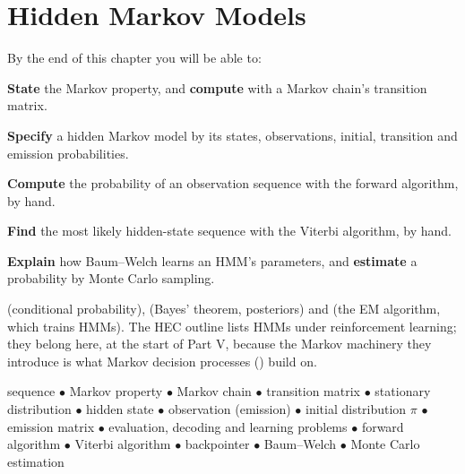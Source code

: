 \chapter{Hidden Markov Models}\label{ch:hmm}

\begin{outcomes}
By the end of this chapter you will be able to:
\begin{tight}
  \item \textbf{State} the Markov property, and \textbf{compute} with a Markov
        chain's transition matrix.
  \item \textbf{Specify} a hidden Markov model by its states, observations, initial,
        transition and emission probabilities.
  \item \textbf{Compute} the probability of an observation sequence with the forward
        algorithm, by hand.
  \item \textbf{Find} the most likely hidden-state sequence with the Viterbi
        algorithm, by hand.
  \item \textbf{Explain} how Baum--Welch learns an HMM's parameters, and
        \textbf{estimate} a probability by Monte Carlo sampling.
\end{tight}
\end{outcomes}

\begin{prereq}
 (conditional probability),  (Bayes' theorem, posteriors)
and  (the EM algorithm, which trains HMMs). The HEC outline lists HMMs
under reinforcement learning; they belong here, at the start of Part V, because the
Markov machinery they introduce is what Markov decision processes () build
on.
\end{prereq}

\begin{keyterms}
sequence $\bullet$ Markov property $\bullet$ Markov chain $\bullet$ transition
matrix $\bullet$ stationary distribution $\bullet$ hidden state $\bullet$ observation
(emission) $\bullet$ initial distribution $\pi$ $\bullet$ emission matrix $\bullet$
evaluation, decoding and learning problems $\bullet$ forward algorithm $\bullet$
Viterbi algorithm $\bullet$ backpointer $\bullet$ Baum--Welch $\bullet$ Monte Carlo
estimation
\end{keyterms}

